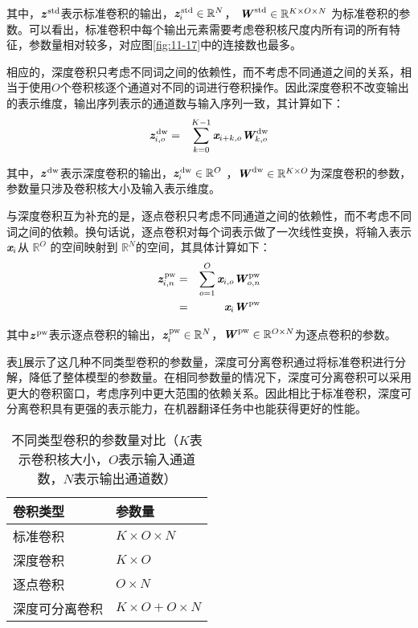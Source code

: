 \noindent 其中，$ \textbf{\em z}^\textrm{\,std}$表示标准卷积的输出，$ \textbf{\em z}_i^\textrm{\,std} \in \mathbb{R}^N$， $\textbf{\em W}^\textrm{\,std} \in \mathbb{R}^{K \times O \times N} $ 为标准卷积的参数。可以看出，标准卷积中每个输出元素需要考虑卷积核尺度内所有词的所有特征，参数量相对较多，对应图\ref{fig:11-17}中的连接数也最多。

\parinterval 相应的，深度卷积只考虑不同词之间的依赖性，而不考虑不同通道之间的关系，相当于使用$O$个卷积核逐个通道对不同的词进行卷积操作。因此深度卷积不改变输出的表示维度，输出序列表示的通道数与输入序列一致，其计算如下：
\begin{eqnarray}
\textbf{\em z}_{i,o}^\textrm{\,dw} &=& \sum_{k=0}^{K-1} \textbf{\em x}_{i+k,o} \textbf{\em W}_{k,o}^\textrm{\,dw}
\label{eq:11-19}
\end{eqnarray}

\noindent 其中，$\textbf{\em z}^\textrm{\,dw}$表示深度卷积的输出，$\textbf{\em z}_i^\textrm{\,dw} \in \mathbb{R}^{O}$ ，$\textbf{\em W}^\textrm{\,dw} \in \mathbb{R}^{K \times O}$为深度卷积的参数，参数量只涉及卷积核大小及输入表示维度。

\parinterval 与深度卷积互为补充的是，逐点卷积只考虑不同通道之间的依赖性，而不考虑不同词之间的依赖。换句话说，逐点卷积对每个词表示做了一次线性变换，将输入表示$\textbf{\em x}_i$从 $\mathbb{R}^{O}$ 的空间映射到 $\mathbb{R}^{N}$的空间，其具体计算如下：
\begin{eqnarray}
\textbf{\em z}_{i,n}^\textrm{\,pw} &=& \sum\limits_{o=1}^{O} \textbf{\em x}_{i,o} \textbf{\em W}_{o,n}^\textrm{\,pw} \nonumber \\
                      &=& \textbf{\em x}_i \textbf{\em W}^\textrm{\,pw}
\label{eq:11-20}
\end{eqnarray}

\noindent 其中$\textbf{\em z}^\textrm{\,pw}$表示逐点卷积的输出，$\textbf{\em z}_{i}^\textrm{\,pw} \in  \mathbb{R}^{N}$，$\textbf{\em W}^\textrm{\,pw} \in \mathbb{R}^{O \times N}$为逐点卷积的参数。

\parinterval 表\ref{tab:11-1}展示了这几种不同类型卷积的参数量，深度可分离卷积通过将标准卷积进行分解，降低了整体模型的参数量。在相同参数量的情况下，深度可分离卷积可以采用更大的卷积窗口，考虑序列中更大范围的依赖关系。因此相比于标准卷积，深度可分离卷积具有更强的表示能力，在机器翻译任务中也能获得更好的性能。

\begin{table}[htp]
\centering
\caption{不同类型卷积的参数量对比（$K$表示卷积核大小，$O$表示输入通道数，$N$表示输出通道数）}
\label{tab:11-1}
\begin{tabular}{l | l}
卷积类型 & 参数量 \\ \hline
\rule{0pt}{12pt}标准卷积 & $K \times O \times N$ \\
深度卷积 & $K \times O$ \\
逐点卷积 & $O \times N$ \\
深度可分离卷积 & $K \times O + O \times N $
\end{tabular}
\end{table}

